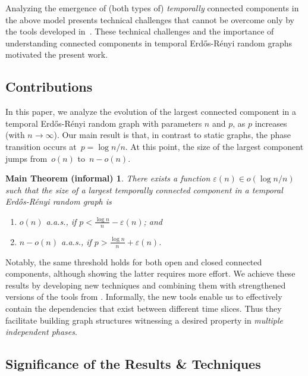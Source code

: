 \documentclass[a4paper,11pt]{article}
\makeatletter
\theoremstyle{definition}
\theoremstyle{plain}
\newtheorem*{maintheorem}{Main Theorem (informal)}
\let\eps\varepsilon
\newcommand{\aas}{a.a.s.\@\xspace}
\newcommand{\Erdos}{Erd\H{o}s}
\newcommand{\Renyi}{R\'enyi}
\newcommand{\ER}{\Erdos-\Renyi}
\makeatother
\begin{document}
Analyzing the emergence of (both types of) \emph{temporally} connected components in the above model presents technical challenges that cannot be overcome only by the tools developed in~\cite{CasteigtsRRZ21}.
These technical challenges and the importance of understanding connected components in temporal \ER{} random graphs motivated the present work.




\subsection{Contributions}
In this paper, we analyze 
the evolution of the largest connected component in a temporal \ER{} random graph with parameters $n$ and $p$, as $p$ increases (with $n \to \infty$).
Our main result is that, in contrast to static graphs, the phase transition occurs at~$p=\log n / n$.
At this point, the size of the largest component jumps from~$o(n)$ to~$n-o(n)$.

\begin{maintheorem}
	There exists a function $\eps(n) \in o(\log n / n)$ such that the size of a largest temporally connected component in a temporal \ER{} random graph is
	\begin{enumerate}
		\item[(i)] $o(n)$ \aas, if $p<\frac{\log n}{n} - \varepsilon(n)$; and
		\item[(ii)] $n-o(n)$ \aas, if $p>\frac{\log n}{n} + \varepsilon(n)$.
	\end{enumerate}
\end{maintheorem}

\noindent
Notably, the same threshold holds for both open and closed connected components, although showing the latter requires more effort.
We achieve these results by developing new techniques and combining them with strengthened versions of the tools from \cite{CasteigtsRRZ21}.
Informally, the new tools enable us to effectively contain the dependencies that exist between different time slices.
Thus they facilitate building graph structures witnessing a desired property in \emph{multiple independent phases}.



\subsection{Significance of the Results \& Techniques}
\end{document}
